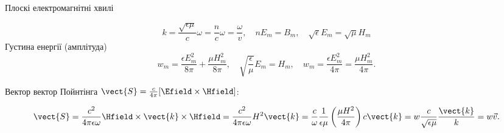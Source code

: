 \documentclass{beamer}
\begin{document}
\begin{frame}[t]{Плоскі електромагнітні хвилі}
\begin{onlyenv}
		\begin{equation*}
			k =  \frac{\sqrt{\epsilon\mu}}{c} \omega = \frac{n}{c} \omega = \frac{\omega}{v}, \quad n E_m = B_m, \quad \sqrt{\epsilon} E_m = \sqrt{\mu} H_m
		\end{equation*}
		Густина енергії (амплітуда)
		\begin{equation*}
			w_m = \frac{\epsilon E_m^2}{8\pi} + \frac{\mu H_m^2}{8\pi}, \quad  \sqrt{\frac{\epsilon}{\mu}} E_m = H_m, \quad w_m = \frac{\epsilon E_m^2}{4\pi} = \frac{\mu H_m^2}{4\pi}.
		\end{equation*}

		Вектор вектор Пойнтінга $ \vect{S} = \frac{c}{4\pi}[\Efield\times\Hfield] $:


		\begin{equation*}
			\vect{S} =  \frac{c^2}{4\pi\epsilon \omega} \Hfield\times\vect{k}\times\Hfield = \frac{c^2}{4\pi\epsilon \omega} H^2 \vect{k} =  \frac{c}{\omega} \frac{1}{\epsilon\mu}\left( \frac{\mu H^2}{4\pi}\right)   c \vect{k} = w \frac{c}{\sqrt{\epsilon\mu}} \frac{\vect{k}}{k}= w \vec{v}.
		\end{equation*}
	\end{onlyenv}
\end{frame}
\end{document}
